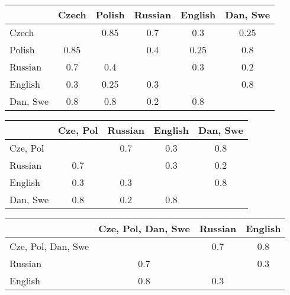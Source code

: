 \documentclass[fontsize=12pt, usenames, dvipsnames, headinclude, headsepline, footinclude, footsepline]{scrartcl}
\begin{document}
\begin{sol}
\begin{enumerate}
      \begin{center}
        \begin{tabular}{@{}l|ccccc@{}}
          \toprule
          & Czech & Polish & Russian & English & Dan, Swe \\ \midrule
          Czech    &       & \cellcolor{ForestGreen!30} 0.85   & 0.7     & 0.3     & 0.25     \\
          Polish   & 0.85  &        & 0.4     & 0.25    & 0.8      \\
          Russian  & 0.7   & 0.4    &         & 0.3     & 0.2      \\
          English  & 0.3   & 0.25   & 0.3     &         & 0.8      \\
          Dan, Swe & 0.8   & 0.8    & 0.2     & 0.8     &          \\ \bottomrule
        \end{tabular}
      \end{center}

      \begin{center}
        \begin{tabular}{@{}l|cccc@{}}
          \toprule
          & Cze, Pol & Russian & English & Dan, Swe \\ \midrule
          Cze, Pol &          & 0.7     & 0.3     & \cellcolor{ForestGreen!30}0.8      \\
          Russian  & 0.7      &         & 0.3     & 0.2      \\
          English  & 0.3      & 0.3     &         & 0.8      \\
          Dan, Swe & 0.8      & 0.2     & 0.8     &          \\ \bottomrule
        \end{tabular}
      \end{center}

      \begin{center}
        \begin{tabular}{@{}l|ccc@{}}
          \toprule
          & Cze, Pol, Dan, Swe & Russian & English \\ \midrule
          Cze, Pol, Dan, Swe &                    & 0.7     & \cellcolor{ForestGreen!30}0.8     \\
          Russian            & 0.7                &         & 0.3     \\
          English            & 0.8                & 0.3     &         \\ \bottomrule
        \end{tabular}
      \end{center}


\end{enumerate}
\end{sol}
\end{document}
